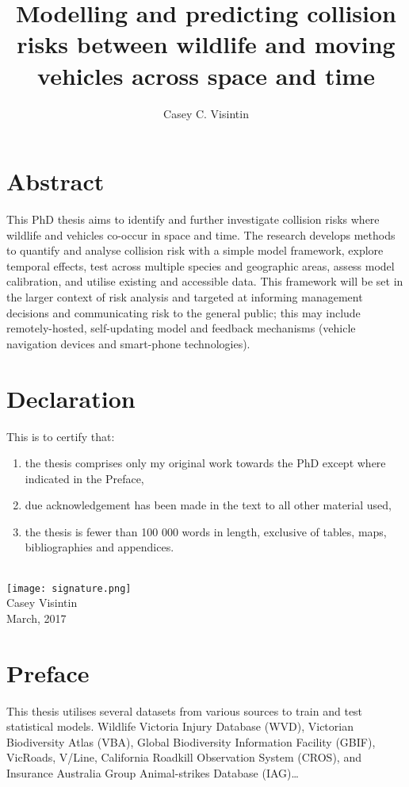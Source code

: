 \documentclass[titlesmallcaps,copyrightpage,examinerscopy]{uomthesis}
\begin{document}
\frontmatter
\title{Modelling and predicting collision risks between wildlife and moving vehicles across space and time}
\author{Casey C. Visintin}

\titlepage

\chapter{Abstract}
This PhD thesis aims to identify and further investigate collision risks where wildlife and vehicles co-occur in space and time.  The research develops methods to quantify and analyse collision risk with a simple model framework, explore temporal effects, test across multiple species and geographic areas, assess model calibration, and utilise existing and accessible data.  This framework will be set in the larger context of risk analysis and targeted at informing management decisions and communicating risk to the general public; this may include remotely-hosted, self-updating model and feedback mechanisms (vehicle navigation devices and smart-phone technologies).

\chapter{Declaration}
This is to certify that:
{\renewcommand{\theenumi}{\roman{enumi}}%
\begin{enumerate}
 \item the thesis comprises only my original work towards the PhD except where indicated in the Preface,
 \item due acknowledgement has been made in the text to all other material used,
 \item the thesis is fewer than 100 000 words in length, exclusive of tables, maps, bibliographies and appendices.
\end{enumerate}
}
\hrulefill \\

{\raggedleft 
\texttt{[image: signature.png]} \\
Casey Visintin \\
March, 2017
}

\chapter{Preface}
This thesis utilises several datasets from various sources to train and test statistical models.  Wildlife Victoria Injury Database (WVD), Victorian Biodiversity Atlas (VBA), Global Biodiversity Information Facility (GBIF), VicRoads, V/Line, California Roadkill Observation System (CROS), and Insurance Australia Group Animal-strikes Database (IAG)\ldots
\end{document}
